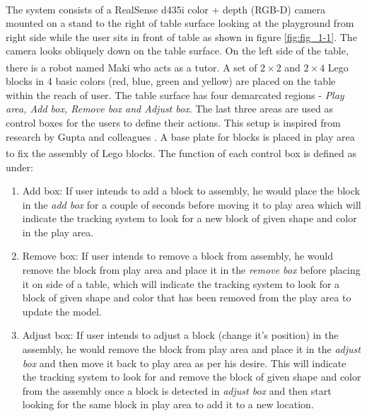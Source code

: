 The system consists of a RealSense\textsuperscript\textregistered{}  d435i color + depth (RGB-D) camera mounted on a stand to the right of table surface looking at the playground from right side while the user sits in front of table as shown in figure \ref{fig:fig_1-1}. The camera looks obliquely down on the table surface. On the left side of the table, there is a robot named Maki who acts as a tutor. A set of $2 \times 2$ and $2 \times 4$ Lego\textsuperscript\textregistered{} blocks in 4 basic colors (red, blue, green and yellow) are placed on the table within the reach of user. The table surface has four demarcated regions - \textit{Play area, Add box, Remove box and Adjust box}. The last three areas are used as control boxes for the users to define their actions. This setup is inspired from research by Gupta and colleagues \parencite{gupta2012duplotrack}. A base plate for blocks is placed in play area to fix the assembly of Lego\textsuperscript\textregistered{} blocks. The function of each control box is defined as under:
\begin{enumerate}
    \item Add box: If user intends to add a block to assembly, he would place the block in the \emph{add box} for a couple of seconds before moving it to play area which will indicate the tracking system to look for a new block of given shape and color in the play area. 
    \item Remove box: If user intends to remove a block from assembly, he would remove the block from play area and place it in the \emph{remove box} before placing it on side of a table, which will indicate the tracking system to look for a block of given shape and color that has been removed from the play area to update the model.
    \item Adjust box: If user intends to adjust a block (change it's position) in the assembly, he would remove the block from play area and place it in the \emph{adjust box} and then move it back to play area as per his desire. This will indicate the tracking system to look for and remove the block of given shape and color from the assembly once a block is detected in \emph{adjust box} and then start looking for the same block in play area to add it to a new location. 
\end{enumerate}

